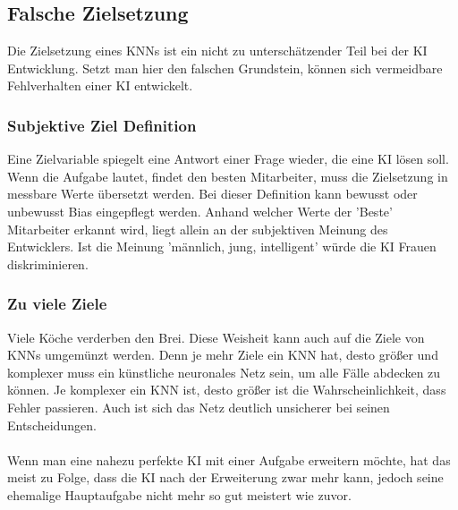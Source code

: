 \documentclass[12pt,oneside,a4paper,parskip]{scrbook}
\begin{document}
\subsection{Falsche Zielsetzung}
Die Zielsetzung eines KNNs ist ein nicht zu unterschätzender Teil bei der KI Entwicklung. Setzt man hier den falschen Grundstein, können sich vermeidbare Fehlverhalten einer KI entwickelt.
\subsubsection{Subjektive Ziel Definition}
Eine Zielvariable spiegelt eine Antwort einer Frage wieder, die eine KI lösen soll. Wenn die Aufgabe lautet, findet den besten Mitarbeiter, muss die Zielsetzung in messbare Werte übersetzt werden. Bei dieser Definition kann bewusst oder unbewusst Bias eingepflegt werden. Anhand welcher Werte der 'Beste' Mitarbeiter erkannt wird, liegt allein an der subjektiven Meinung des Entwicklers. Ist die Meinung 'männlich, jung, intelligent' würde die KI Frauen diskriminieren.
\subsubsection{Zu viele Ziele}
Viele Köche verderben den Brei. Diese Weisheit kann auch auf die Ziele von KNNs umgemünzt werden. Denn je mehr Ziele ein KNN hat, desto größer und komplexer muss ein künstliche neuronales Netz sein, um alle Fälle abdecken zu können. Je komplexer ein KNN ist, desto größer ist die Wahrscheinlichkeit, dass Fehler passieren. Auch ist sich das Netz deutlich unsicherer bei seinen Entscheidungen.
\\\\ %
Wenn man eine nahezu perfekte KI mit einer Aufgabe erweitern möchte, hat das meist zu Folge, dass die KI nach der Erweiterung zwar mehr kann, jedoch seine ehemalige Hauptaufgabe nicht mehr so gut meistert wie zuvor.
\end{document}
